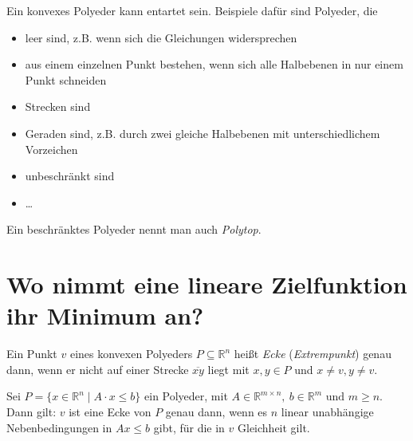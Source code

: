 Ein konvexes Polyeder kann entartet sein. Beispiele dafür sind Polyeder, die
\begin{itemize}
  \item leer sind, z.B. wenn sich die Gleichungen widersprechen
  \item aus einem einzelnen Punkt bestehen, wenn sich alle Halbebenen in nur einem Punkt schneiden
  \item Strecken sind
  \item Geraden sind, z.B. durch zwei gleiche Halbebenen mit unterschiedlichem Vorzeichen
  \item unbeschränkt sind
  \item \dots
\end{itemize}

\begin{Def}[Polytop]
  \hspace{\parindent}Ein beschränktes Polyeder nennt man auch \textit{Polytop}.
\end{Def}

\section{Wo nimmt eine lineare Zielfunktion ihr Minimum an?}
%
%
%

\begin{Def}
  \hspace{\parindent}Ein Punkt $v$ eines konvexen Polyeders $P \subseteq \mathbb{R}^n$ heißt \textit{Ecke} (\textit{Extrempunkt}) genau dann, wenn er nicht auf einer Strecke $\overline{xy}$ liegt mit $x,y \in P$ und $x \neq v, y\neq v$.
\end{Def}

\begin{Lma}\label{kap5Lma1}
  \hspace{\parindent}Sei $P = \{x \in \mathbb{R}^n \mid A \cdot x \le b\}$ ein Polyeder, mit $A \in \mathbb{R}^{m \times n},~ b \in \mathbb{R}^m \text{ und } m \ge n$. Dann gilt: $v$ ist eine Ecke von $P$ genau dann, wenn es $n$ linear unabhängige Nebenbedingungen in $A x \le b$ gibt, für die in $v$ Gleichheit gilt.
\end{Lma}

